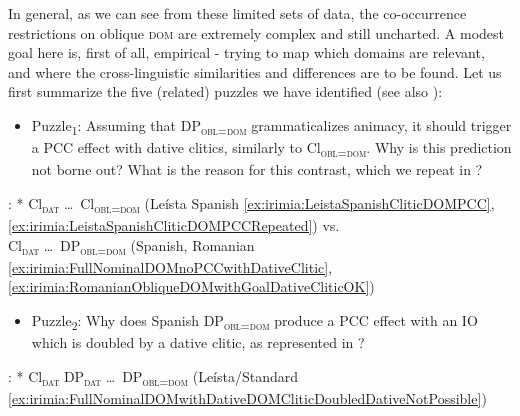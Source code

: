 \documentclass[output=paper,colorlinks,citecolor=brown,draft,draftmode]{langscibook}
\begin{document}

In general, as we can see from these limited sets of data, the co-occurrence restrictions on oblique \textsc{dom} are extremely complex and still uncharted. A modest goal here is, first of all, empirical - trying to map which domains are relevant, and where the cross-linguistic similarities and differences are to be found. Let us first summarize the five (related) puzzles we have identified (see also ):

\z

\begin{itemize}
\item {Puzzle\textsubscript{1}}: Assuming that DP\textsubscript{\textsc{obl=dom}} grammaticalizes animacy, it should trigger a PCC effect with dative clitics, similarly to Cl\textsubscript{\textsc{obl=dom}}. Why is this prediction not borne out? What is the reason for this contrast, which we repeat in ?
\end{itemize}


: * Cl\textsubscript{\textsc{dat}}  \ldots\, Cl\textsubscript{\textsc{obl=dom}} ({Leísta Spanish} \ref{ex:irimia:LeistaSpanishCliticDOMPCC}, \ref{ex:irimia:LeistaSpanishCliticDOMPCCRepeated})
vs. \\
\indent \hskip 1.6cm \Checkmark Cl\textsubscript{\textsc{dat}}  \ldots\, DP\textsubscript{\textsc{obl=dom}} ({Spanish, Romanian} \ref{ex:irimia:FullNominalDOMnoPCCwithDativeClitic}, \ref{ex:irimia:RomanianObliqueDOMwithGoalDativeCliticOK}) \label{ex:irimia:Puzzle1}
\z

\begin{itemize}
\item {Puzzle\textsubscript{2}}:
Why does Spanish DP\textsubscript{\textsc{obl=dom}} produce a \textsc{PCC} effect with an IO which is doubled by a dative clitic, as represented in ?
\end{itemize}

: * Cl\textsubscript{\textsc{dat}} DP\textsubscript{\textsc{dat}} \ldots\, DP\textsubscript{\textsc{obl=dom}} ({Leísta/Standard} \ref{ex:irimia:FullNominalDOMwithDativeDOMCliticDoubledDativeNotPossible}) \label{ex:irimia:Puzzle2}
\z
\end{document}
